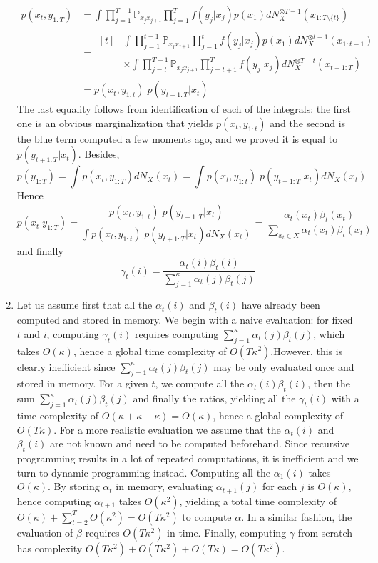 \documentclass[a4paper,11pt, hidelinks]{article}
\begin{document}
\begin{enumerate}[label=(\alph*)]
$$\begin{aligned}
		p(x_t, y_{1:T}) &= \int \prod_{j=1}^{T-1}\mathbb P_{x_{j} x_{j+1}} \prod_{j=1}^{T}f(y_j|x_j) p(x_1) dN_X^{\otimes T-1}(x_{1:T\setminus \{t\}}) \\
		&= \begin{aligned}[t]&\int \prod_{j=1}^{t-1}\mathbb P_{x_{j} x_{j+1}}\prod_{j=1}^{t}f(y_j|x_j) p(x_1) dN_X^{\otimes t-1}(x_{1:t-1})\\ &\times \int \prod_{j=t}^{T-1}\mathbb P_{x_{j} x_{j+1}} \prod_{j=t+1}^{T}f(y_j|x_j) dN_X^{\otimes T-t}(x_{t+1:T}) \end{aligned}\\
		&= p(x_t, y_{1:t})\; p(y_{t+1:T}|x_t)
	\end{aligned} $$
	The last equality follows from identification of each of the integrals: the first one is an obvious marginalization that yields $p(x_t, y_{1:t})$ and the second is the blue term computed a few moments ago, and we proved it is equal to $p(y_{t+1:T}|x_t)$.
	Besides, $$
		p(y_{1:T}) = \int p(x_t, y_{1:T}) dN_X(x_t) = \int p(x_t, y_{1:t})\; p(y_{t+1:T}|x_t) dN_X(x_t)$$
	Hence $$p(x_t| y_{1:T}) = \frac{p(x_t, y_{1:t})\; p(y_{t+1:T}|x_t)}{\int p(x_t, y_{1:t})\; p(y_{t+1:T}|x_t) dN_X(x_t)} = \frac{\alpha_t(x_t)\beta_t(x_t)}{\sum_{x_t\in X} \alpha_t(x_t)\beta_t(x_t) }$$
	and finally $$ \gamma_t(i) = \frac{\alpha_t(i)\beta_t(i)}{\sum_{j=1}^\kappa \alpha_t(j)\beta_t(j)}$$

	\item Let us assume first that all the $\alpha_t(i)$ and $\beta_t(i)$ have already been computed and stored in memory. We begin with a naive evaluation: for fixed $t$ and $i$, computing $\gamma_t(i)$ requires computing $\sum_{j=1}^\kappa \alpha_t(j)\beta_t(j)$, which takes $O(\kappa)$, hence a global time complexity of $O(T\kappa^2)$.\newline However, this is clearly inefficient since $\sum_{j=1}^\kappa \alpha_t(j)\beta_t(j)$ may be only evaluated once and stored in memory. For a given $t$, we compute all the $\alpha_t(i)\beta_t(i)$, then the sum $\sum_{j=1}^\kappa \alpha_t(j)\beta_t(j)$ and finally the ratios, yielding all the $\gamma_t(i)$ with a time complexity of $O(\kappa + \kappa + \kappa) = O(\kappa)$, hence a global complexity of $O(T\kappa)$.\newline
	\newline
	For a more realistic evaluation we assume that the $\alpha_t(i)$ and $\beta_t(i)$ are not known and need to be computed beforehand. Since recursive programming results in a lot of repeated computations, it is inefficient and we turn to dynamic programming instead. Computing all the $\alpha_1(i)$ takes $O(\kappa)$. By storing $\alpha_{t}$ in memory, evaluating $\alpha_{t+1}(j)$ for each $j$ is $O(\kappa)$, hence computing $\alpha_{t+1}$ takes $O(\kappa^2)$, yielding a total time complexity of $O(\kappa) + \sum_{t=2}^T O(\kappa^2) = O(T\kappa^2)$ to compute $\alpha$. In a similar fashion, the evaluation of $\beta$ requires $O(T\kappa^2)$ in time. Finally, computing $\gamma$ from scratch has complexity $O(T\kappa^2) + O(T\kappa^2) + O(T\kappa) = O(T\kappa^2)$.


\end{enumerate}
\end{document}

